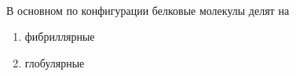 


\paragraph*{}В основном по конфигурации белковые молекулы делят на 

\begin{enumerate}

	\item фибриллярные
	\item глобулярные

\end{enumerate}




